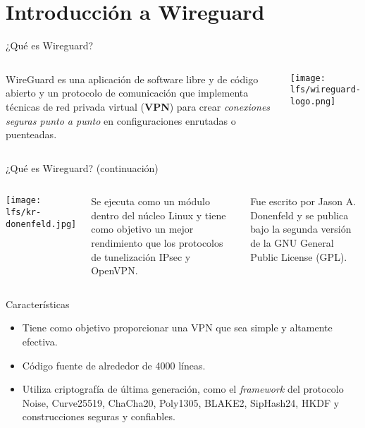 
\section{Introducción a Wireguard}

\begin{frame}[c]{¿Qué es Wireguard?}
    \begin{columns}
        WireGuard es una aplicación de software libre y de código abierto
        y un protocolo de comunicación que implementa técnicas de red
        privada virtual (\textbf{VPN}) para crear \emph{conexiones seguras
        punto a punto} en configuraciones enrutadas o puenteadas.
        \begin{center}
            \texttt{[image: lfs/wireguard-logo.png]}
        \end{center}
    \end{columns}
\end{frame}

\begin{frame}[c]{¿Qué es Wireguard? (continuación)}
    \begin{columns}
        \begin{center}
            \texttt{[image: lfs/kr-donenfeld.jpg]}
        \end{center}
        Se ejecuta como un módulo dentro del núcleo Linux y tiene como
        objetivo un mejor rendimiento que los protocolos de tunelización
        IPsec y OpenVPN.

        \vspace{\baselineskip}
        Fue escrito por Jason A. Donenfeld y se publica bajo la segunda
        versión de la GNU General Public License (GPL).
    \end{columns}
\end{frame}

\begin{frame}[c]{Características}
  \begin{itemize}
    \item Tiene como objetivo proporcionar una VPN que sea
          simple y altamente efectiva.
    \pausa
    \item Código fuente de alrededor de 4000 líneas.
    \pausa
    \item Utiliza criptografía de última generación, como el \emph{framework}
          del protocolo Noise, Curve25519, ChaCha20, Poly1305, BLAKE2,
          SipHash24, HKDF y construcciones seguras y confiables.

  \end{itemize}
\end{frame}

